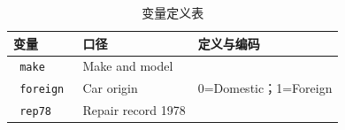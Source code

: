 \begin{table}[htbp]
  \centering
  \caption{ 变量定义表 }
  \label{tab:list}
  \small
  \begin{tabular}{ p{3cm}p{4cm}p{7cm} }
    \toprule
变量 & 口径 & 定义与编码\\
    \midrule
\texttt{ make } & Make and model & \\
\texttt{ foreign } & Car origin & 0=Domestic；1=Foreign\\
\texttt{ rep78 } & Repair record 1978 & \\
    \bottomrule
  \end{tabular}
\end{table}